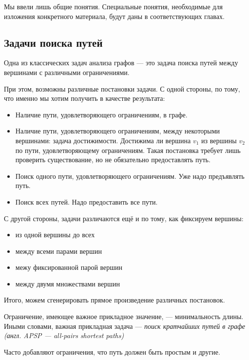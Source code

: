 Мы ввели лишь общие понятия.
Специальные понятия, необходимые для изложения конкретного материала, будут даны в соответствующих главах.

\subsection{Задачи поиска путей}

Одна из классических задач анализа графов --- это задача поиска путей между вершинами с различными ограничениями.

При этом, возможны различные постановки задачи.
С одной стороны, по тому, что именно мы хотим получить в качестве результата:
\begin{itemize}
\item Наличие пути, удовлетворяющего ограничениям, в графе.
\item Наличие пути, удовлетворяющего ограничениям, между некоторыми вершинами: задача достижимости. 
      Достижима ли вершина $v_1$ из вершины $v_2$ по пути, удовлетворяющему ограничениям.
      Такая постановка требует лишь проверить существование, но не обязательно предоставлять путь.
\item Поиск одного пути, удовлетворяющего ограничениям. Уже надо предъявлять путь.
\item Поиск всех путей. Надо предоставить все пути.
\end{itemize}

С другой стороны, задачи различаются ещё и по тому, как фиксируем вершины:
\begin{itemize}
\item из одной вершины до всех
\item между всеми парами вершин
\item межу фиксированной парой вершин
\item между двумя множествами вершин
\end{itemize}

Итого, можем сгенерировать прямое произведение различных постановок.

Ограничение, имеющее важное прикладное значение, --- минимальность длины. 
Иными словами, важная прикладная задача --- \textit{поиск кратчайших путей в графе (англ. APSP --- all-pairs shortest paths)}

Часто добавляют ограничения, что путь должен быть простым и другие.

